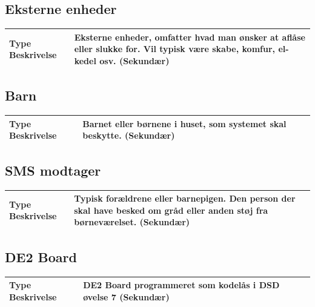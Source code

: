 \begin{table}[!htbp] \centering
\subsection{Eksterne enheder}
\begin{tabular}{|p{4cm}|p{8cm}|}
	\hline
		\textbf{Type Beskrivelse} &
			Eksterne enheder, omfatter hvad man ønsker at aflåse eller slukke for. 
			Vil typisk være skabe, komfur, el-kedel osv. (Sekundær) \\\hline
	\end{tabular}
\end{table}

\begin{table}[!htbp] \centering
\subsection{Barn}
\begin{tabular}{|p{4cm}|p{8cm}|}
	\hline
		\textbf{Type Beskrivelse} &
			Barnet eller børnene i huset, som systemet skal beskytte.	(Sekundær) \\\hline
	\end{tabular}
\end{table}

\begin{table}[!htbp] \centering
\subsection{SMS modtager}
\begin{tabular}{|p{4cm}|p{8cm}|}
	\hline
		\textbf{Type Beskrivelse} &
			Typisk forældrene eller barnepigen. Den person der skal have besked om gråd eller anden støj fra børneværelset. (Sekundær) \\\hline
	\end{tabular}
\end{table}

\begin{table}[!htbp] \centering
\subsection{DE2 Board}
\begin{tabular}{|p{4cm}|p{8cm}|}
	\hline
		\textbf{Type Beskrivelse} &
			DE2 Board programmeret som kodelås i DSD øvelse 7 (Sekundær) \\\hline
	\end{tabular}
\end{table}


